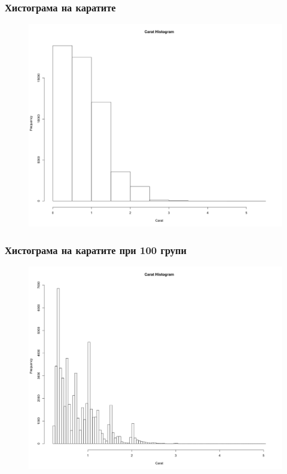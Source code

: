 \documentclass{beamer}
\begin{document}
\begin{frame}
\frametitle{Хистограма на каратите}
\begin{figure}[]\includegraphics[width=\textwidth,height=0.75\textheight]{pic0021}\end{figure}
\end{frame}

\begin{frame}
\frametitle{Хистограма на каратите при 100 групи}
\begin{figure}[]\includegraphics[width=\textwidth,height=0.75\textheight]{pic0022}\end{figure}
\end{frame}
\end{document}
